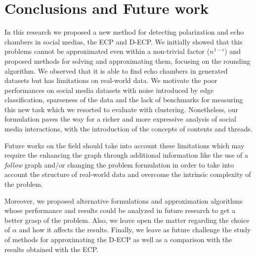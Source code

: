 \chapter{Conclusions and Future work}
\label{ch:conclusionsAndFutureWork}

In this research we proposed a new method for detecting polarization and echo
chambers in social medias, the \acrshort{ECP} and \acrshort{D-ECP}. We
initially showed that this problems cannot be approximated even within a
non-trivial factor ($n^{1-\epsilon}$) and proposed methods for solving and
approximating them, focusing on the rounding algorithm. We observed that it is
able to find echo chambers in generated datasets but has limitations on
real-world data. We motivate the poor performances on social media datasets
with noise introduced by edge classification, sparseness of the data and the
lack of benchmarks for measuring this new task which we resorted to evaluate with
clustering. Nonetheless, our formulation paves the way for a richer and more
expressive analysis of social media interactions, with the introduction
of the concepts of contents and threads.

Future works on the field should take into account these limitations which
may require the enhancing the graph through additional information like the use
of a \emph{follow} graph and/or
changing the problem formulation in order to take into account the structure
of real-world data and overcome the intrinsic complexity of the problem.

Moreover, we proposed alternative formulations and approximation algorithms
whose performance and results could be analyzed in future research to get a
better grasp of the problem. Also, we leave open the matter regarding the
choice of $\alpha$ and how it affects the results. Finally, we leave as future
challenge the study of methods for approximating the \acrshort{D-ECP} as well
as a comparison with the results obtained with the \acrshort{ECP}.

